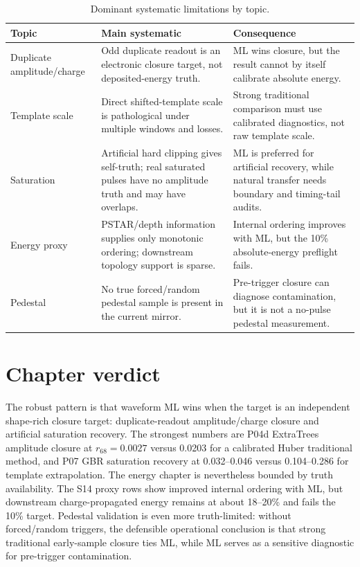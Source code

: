 \begin{table}[H]
\centering
\caption{Dominant systematic limitations by topic.}
\begin{tabular}{p{}p{}p{}}
\toprule
Topic & Main systematic & Consequence \\
\midrule
Duplicate amplitude/charge & Odd duplicate readout is an electronic closure target, not deposited-energy truth. & ML wins closure, but the result cannot by itself calibrate absolute energy. \\
Template scale & Direct shifted-template scale is pathological under multiple windows and losses. & Strong traditional comparison must use calibrated diagnostics, not raw template scale. \\
Saturation & Artificial hard clipping gives self-truth; real saturated pulses have no amplitude truth and may have overlaps. & ML is preferred for artificial recovery, while natural transfer needs boundary and timing-tail audits. \\
Energy proxy & PSTAR/depth information supplies only monotonic ordering; downstream topology support is sparse. & Internal ordering improves with ML, but the 10\% absolute-energy preflight fails. \\
Pedestal & No true forced/random pedestal sample is present in the current mirror. & Pre-trigger closure can diagnose contamination, but it is not a no-pulse pedestal measurement. \\
\bottomrule
\end{tabular}
\label{tab:amplitude-systematics}
\end{table}

\section{Chapter verdict}

The robust pattern is that waveform ML wins when the target is an independent
shape-rich closure target: duplicate-readout amplitude/charge closure and
artificial saturation recovery.  The strongest numbers are P04d ExtraTrees
amplitude closure at \(r_{68}=0.0027\) versus 0.0203 for a calibrated Huber
traditional method, and P07 GBR saturation recovery at 0.032--0.046 versus
0.104--0.286 for template extrapolation.  The energy chapter is nevertheless
bounded by truth availability.  The S14 proxy rows show improved internal
ordering with ML, but downstream charge-propagated energy remains at about
18--20\% and fails the 10\% target.  Pedestal validation is even more
truth-limited: without forced/random triggers, the defensible operational
conclusion is that strong traditional early-sample closure ties ML, while ML
serves as a sensitive diagnostic for pre-trigger contamination.
